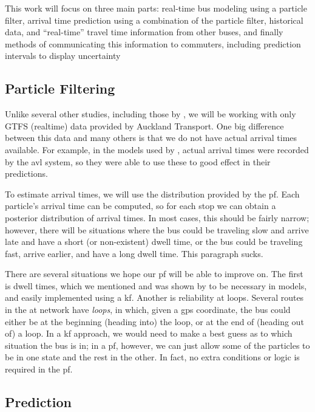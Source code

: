\documentclass[12pt,a4paper]{article}
\begin{document}
This work will focus on three main parts:
real-time bus modeling using a particle filter,
arrival time prediction using a combination of the particle filter,
historical data, and ``real-time'' travel time information
from other buses,
and finally methods of communicating this information to commuters,
including prediction intervals
to display uncertainty


\subsection{Particle Filtering}
\label{sec:new-pf}

Unlike several other studies, including those by \cite{hans-etal:2015},
we will be working with only GTFS (realtime) data provided by Auckland Transport.
One big difference between this data and many others is that we do not have
actual arrival times available.
For example, in the models used by \cite{hans-etal:2015},
actual arrival times were recorded by the \gls{avl} system, 
so they were able to use these to good effect in their predictions.


To estimate arrival times, we will use the distribution provided by the \gls{pf}.
Each particle's arrival time can be computed, so for each stop we can obtain 
a posterior distribution of arrival times.
In most cases, this should be fairly narrow;
however, there will be situations where the bus could be traveling slow and arrive
late and have a short (or non-existent) dwell time,
or the bus could be traveling fast, arrive earlier,
and have a long dwell time.
This paragraph sucks.


There are several situations we hope our \gls{pf} will be able to improve on.
The first is dwell times, which we mentioned and was shown by 
\cite{hans-etal:2015} to be necessary in models, and easily implemented
using a \gls{kf}.
Another is reliability at loops.
Several routes in the \gls{at} network have \emph{loops},
in which, given a \gls{gps} coordinate, the bus could either be
at the beginning (heading into) the loop, or at the end of (heading out of) a loop.
In a \gls{kf} approach, we would need to make a best guess as to which situation 
the bus is in; 
in a \gls{pf}, however, we can just allow some of the particles to be in one state
and the rest in the other.
In fact, no extra conditions or logic is required in the \gls{pf}.





\subsection{Prediction}
\label{sec:new-prediction}
\end{document}
